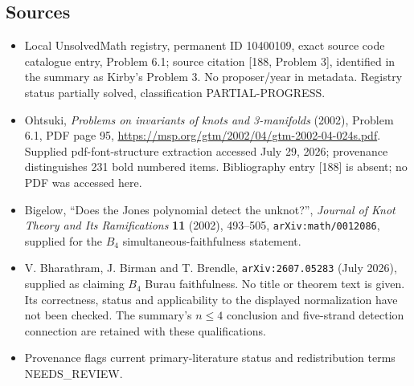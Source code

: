 \documentclass[11pt]{article}
\begin{document}
\subsection{Sources}
\begin{itemize}
\item Local UnsolvedMath registry, permanent ID 10400109, exact source code catalogue entry, Problem 6.1; source citation [188, Problem 3], identified in the summary as Kirby's Problem 3. No proposer/year in metadata. Registry status partially solved, classification PARTIAL-PROGRESS.
\item Ohtsuki, \emph{Problems on invariants of knots and 3-manifolds} (2002), Problem 6.1, PDF page 95, \url{https://msp.org/gtm/2002/04/gtm-2002-04-024s.pdf}. Supplied pdf-font-structure extraction accessed July 29, 2026; provenance distinguishes 231 bold numbered items. Bibliography entry [188] is absent; no PDF was accessed here.
\item Bigelow, ``Does the Jones polynomial detect the unknot?'', \emph{Journal of Knot Theory and Its Ramifications} \textbf{11} (2002), 493--505, \texttt{arXiv:math/0012086}, supplied for the $B_4$ simultaneous-faithfulness statement.
\item V. Bharathram, J. Birman and T. Brendle, \texttt{arXiv:2607.05283} (July 2026), supplied as claiming $B_4$ Burau faithfulness. No title or theorem text is given. Its correctness, status and applicability to the displayed normalization have not been checked. The summary's $n\leq4$ conclusion and five-strand detection connection are retained with these qualifications.
\item Provenance flags current primary-literature status and redistribution terms NEEDS\_REVIEW.
\end{itemize}
\end{document}
